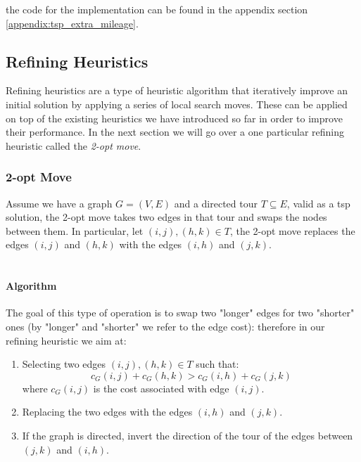 \documentclass{article}
\begin{document}
the code for the implementation can be found in the appendix section \ref{appendix:tsp_extra_mileage}.

\subsection{Refining Heuristics}
Refining heuristics are a type of heuristic algorithm that iteratively improve an initial solution by applying a series of local search moves. These can be applied on top of the existing heuristics we have 
introduced so far in order to improve their performance. In the next section we will go over a one particular refining heuristic called the \textit{2-opt move}\cite{Heuristics_for_the_Traveling_Salesman_Problem}.

\subsubsection{2-opt Move}
Assume we have a graph $G = (V, E)$ and a directed tour $T \subseteq E$, valid as a tsp solution, 
the 2-opt move takes two edges in that tour and swaps the nodes 
between them.  In particular, let $(i, j), (h, k) \in T$, the 2-opt move replaces the edges $(i, j)$ and $(h, k)$ with the edges $(i, h)$ and $(j, k)$. \\
\\
\paragraph{Algorithm}
The goal of this type of operation is to swap two "longer" edges for two "shorter" ones (by "longer" and "shorter" we refer to the edge cost): 
therefore in our refining heuristic we aim at:
\begin{enumerate}
	\item Selecting two edges $(i, j), (h, k) \in T$ such that:
	\begin{equation}
		c_{G}(i, j) + c_{G}(h, k) > c_{G}(i, h) + c_{G}(j, k)
		\label{eq:2-opt-move}
	\end{equation}
	where $c_G(i, j)$ is the cost associated with edge $(i, j)$.
	\item Replacing the two edges with the edges $(i, h)$ and $(j, k)$.
	\item If the graph is directed, invert the direction of the tour of the edges between $(j, k)$ and $(i, h)$.
\end{enumerate}
\end{document}
